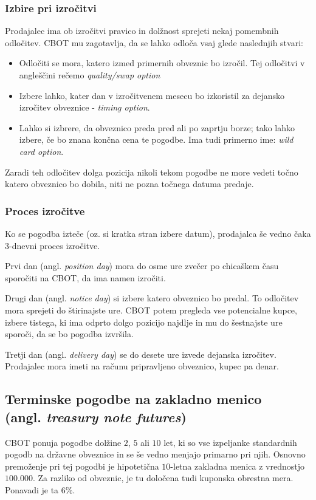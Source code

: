 \documentclass[a4paper]{article}
\begin{document}

\subsubsection{Izbire pri izročitvi}
Prodajalec ima ob izročitvi pravico in dolžnost sprejeti nekaj pomembnih odločitev. CBOT mu 
zagotavlja, da se lahko odloča vsaj glede naslednjih stvari:

\begin{itemize}
    \item Odločiti se mora, katero izmed primernih obveznic bo izročil. Tej odločitvi v angleščini 
            rečemo \textit{quality/swap option}
    \item Izbere lahko, kater dan v izročitvenem mesecu bo izkoristil za dejansko izročitev
            obveznice - \textit{timing option}.
    \item Lahko si izbrere, da obveznico preda pred ali po zaprtju borze; tako lahko izbere, če 
            bo znana končna cena te pogodbe. Ima tudi primerno ime: \textit{wild card option}. 
\end{itemize}

Zaradi teh odločitev dolga pozicija nikoli tekom pogodbe ne more vedeti točno katero obveznico bo
dobila, niti ne pozna točnega datuma predaje.

\subsubsection{Proces izročitve}
Ko se pogodba izteče (oz. si kratka stran izbere datum), prodajalca še vedno čaka 3-dnevni proces 
izročitve. 

Prvi dan (angl. \textit{position day}) mora do osme ure zvečer po chicaškem času sporočiti na 
CBOT, da ima namen izročiti. 

Drugi dan (angl. \textit{notice day}) si izbere katero obveznico bo predal. To odločitev mora 
sprejeti do štirinajste ure. CBOT potem pregleda vse potencialne kupce, izbere tistega, ki 
ima odprto dolgo pozicijo najdlje in mu do šestnajste ure sporoči, da se bo pogodba izvršila. 

Tretji dan (angl. \textit{delivery day}) se do desete ure izvede dejanska izročitev. Prodajalec 
mora imeti na računu pripravljeno obveznico, kupec pa denar. 


\subsection{Terminske pogodbe na zakladno menico \\ (angl. \textit{treasury note futures})}
CBOT ponuja pogodbe dolžine $2$, $5$ ali $10$ let, ki so vse izpeljanke standardnih pogodb na 
državne obveznice in se še vedno menjajo primarno pri njih. 
Osnovno premoženje pri tej pogodbi je hipotetična $10$-letna zakladna menica z vrednostjo 
\textdollar$100.000$. Za razliko od obveznic, je tu določena tudi kuponska obrestna mera. 
Ponavadi je ta $6\%$. 
\end{document}
